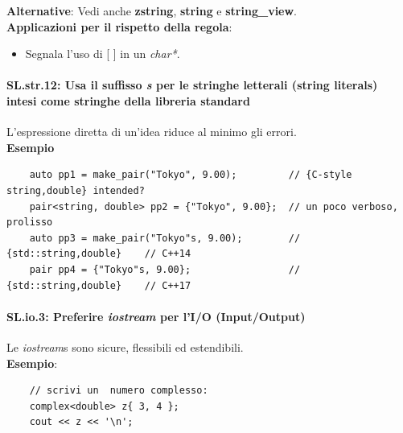 \textsf{\small \textbf{Alternative}: Vedi anche \textbf{zstring}, \textbf{string} e \textbf{string\_view}.} \\

\textsf{\small \textbf{Applicazioni per il rispetto della regola}: }

\begin{itemize}
	\item \textsf{\small Segnala l'uso di [ ] in un \emph{char*}.}
\end{itemize}

\paragraph{SL.str.12: Usa il suffisso \emph{s} per le stringhe letterali (string literals) intesi come stringhe della libreria standard}

\textsf{\small L'espressione diretta di un'idea riduce al minimo gli errori.} \\

\textsf{\small \textbf{Esempio}}

\begin{lstlisting}
	auto pp1 = make_pair("Tokyo", 9.00);         // {C-style string,double} intended?
	pair<string, double> pp2 = {"Tokyo", 9.00};  // un poco verboso, prolisso
	auto pp3 = make_pair("Tokyo"s, 9.00);        // {std::string,double}    // C++14
	pair pp4 = {"Tokyo"s, 9.00};                 // {std::string,double}    // C++17
\end{lstlisting}


\paragraph{SL.io.3: Preferire \emph{iostream} per l'I/O (Input/Output)}

\textsf{\small Le \emph{iostream}s sono sicure, flessibili ed estendibili.} \\

\textsf{\small \textbf{Esempio}: } \\

\begin{lstlisting}
	// scrivi un  numero complesso:
	complex<double> z{ 3, 4 };
	cout << z << '\n';
\end{lstlisting}

